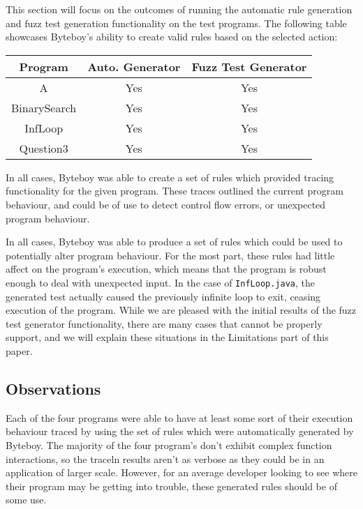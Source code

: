 \documentclass[letterpaper,twocolumn,10pt]{article}
\begin{document}
This section will focus on the outcomes of running the automatic rule generation and fuzz test generation functionality on the test programs. The following table showcases Byteboy's ability to create valid rules based on the selected action:
\begin{center}
 \begin{tabular}{||c | c | c||} 
 \hline
 Program & Auto. Generator & Fuzz Test Generator\\ [0.5ex] 
 \hline\hline
 A & Yes & Yes\\ 
 \hline
 BinarySearch & Yes & Yes\\
 \hline
 InfLoop & Yes & Yes\\
 \hline
 Question3 & Yes & Yes\\ [1ex] 
 \hline
\end{tabular}
\end{center}

In all cases, Byteboy was able to create a set of rules which provided tracing functionality for the given program. These traces outlined the current program behaviour, and could be of use to detect control flow errors, or unexpected program behaviour.

In all cases, Byteboy was able to produce a set of rules which could be used to potentially alter program behaviour. For the most part, these rules had little affect on the program's execution, which means that the program is robust enough to deal with unexpected input. In the case of {\tt InfLoop.java}, the generated test actually caused the previously infinite loop to exit, ceasing execution of the program. While we are pleased with the initial results of the fuzz test generator functionality, there are many cases that cannot be properly support, and we will explain these situations in the Limitations part of this paper. 

\subsection{Observations}

Each of the four programs were able to have at least some sort of their execution behaviour traced by using the set of rules which were automatically generated by Byteboy. The majority of the four program's don't exhibit complex function interactions, so the traceln results aren't as verbose as they could be in an application of larger scale. However, for an average developer looking to see where their program may be getting into trouble, these generated rules should be of some use.
\end{document}
